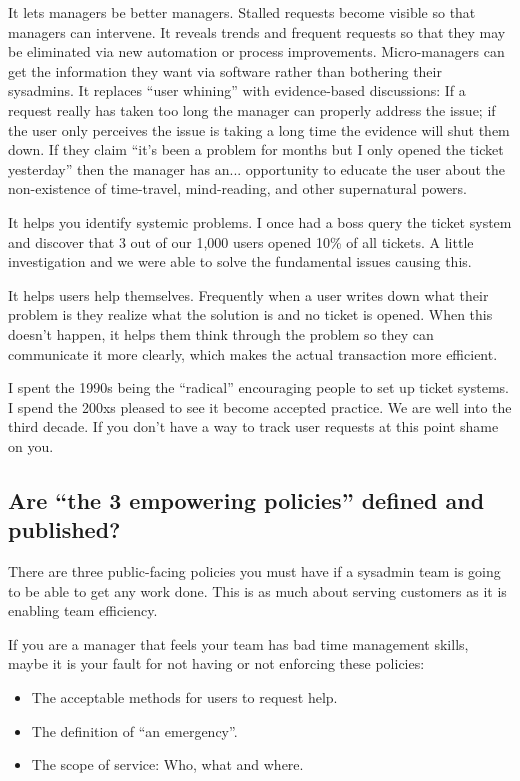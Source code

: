 \documentclass{article}
\begin{document}
It lets managers be better managers. Stalled requests become visible so that managers can intervene. It reveals trends and frequent requests so that they may be eliminated via new automation or process improvements. Micro-managers can get the information they want via software rather than bothering their sysadmins. It replaces ``user whining'' with evidence-based discussions: If a request really has taken too long the manager can properly address the issue; if the user only perceives the issue is taking a long time the evidence will shut them down. If they claim ``it's been a problem for months but I only opened the ticket yesterday'' then the manager has an... opportunity to educate the user about the non-existence of time-travel, mind-reading, and other supernatural powers.

It helps you identify systemic problems. I once had a boss query the ticket system and discover that 3 out of our 1,000 users opened 10\% of all tickets. A little investigation and we were able to solve the fundamental issues causing this.

It helps users help themselves. Frequently when a user writes down what their problem is they realize what the solution is and no ticket is opened. When this doesn't happen, it helps them think through the problem so they can communicate it more clearly, which makes the actual transaction more efficient.

I spent the 1990s being the ``radical'' encouraging people to set up ticket systems. I spend the 200xs pleased to see it become accepted practice. We are well into the third decade. If you don't have a way to track user requests at this point shame on you.

\subsection{Are ``the 3 empowering policies'' defined and published? \Checkmark}
There are three public-facing policies you must have if a sysadmin team is going to be able to get any work done. This is as much about serving customers as it is enabling team efficiency.

If you are a manager that feels your team has bad time management skills, maybe it is your fault for not having or not enforcing these policies:

\begin{itemize}
    \item The acceptable methods for users to request help.
    \item The definition of ``an emergency''.
    \item The scope of service: Who, what and where.
\end{itemize}
\end{document}
